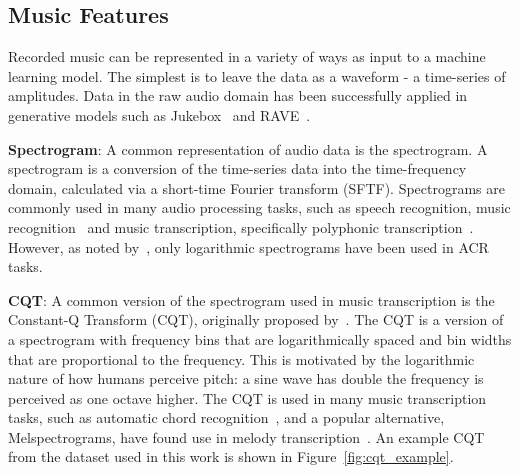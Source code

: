 



\subsection{Music Features}\label{sec:background-features}

Recorded music can be represented in a variety of ways as input to a machine learning model. The simplest is to leave the data as a waveform - a time-series of amplitudes. Data in the raw audio domain has been successfully applied in generative models such as Jukebox~\citep{Jukebox} and RAVE~\citep{RAVE}.

\textbf{Spectrogram}: A common representation of audio data is the spectrogram. A spectrogram is a conversion of the time-series data into the time-frequency domain, calculated via a short-time Fourier transform (SFTF). Spectrograms are commonly used in many audio processing tasks, such as speech recognition, music recognition~\citep{ShazamSpectrogram} and music transcription, specifically polyphonic transcription~\citep{PianoTranscriptionWithTransformer}. However, as noted by~\citet{20YearsofACR}, only logarithmic spectrograms have been used in ACR tasks.

\textbf{CQT}: A common version of the spectrogram used in music transcription is the Constant-Q Transform (CQT), originally proposed by~\citet{CQT}. The CQT is a version of a spectrogram with frequency bins that are logarithmically spaced and bin widths that are proportional to the frequency. This is motivated by the logarithmic nature of how humans perceive pitch: a sine wave has double the frequency is perceived as one octave higher. The CQT is used in many music transcription tasks, such as automatic chord recognition~\citep{FirstDeepLearningCQT}, and a popular alternative, Melspectrograms, have found use in melody transcription~\citep{PianoTranscriptionWithTransformer}. An example CQT from the dataset used in this work is shown in Figure~\ref{fig:cqt_example}.

